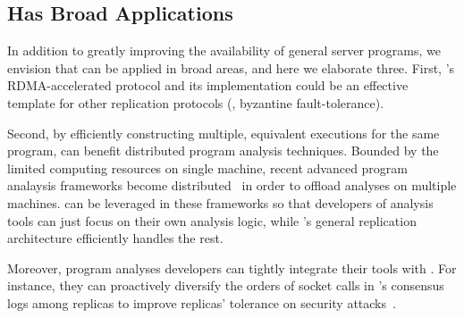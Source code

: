 





\subsection{\xxx Has Broad Applications}\label{sec:apps}

In addition to greatly improving the availability of general server programs, 
we envision that \xxx can be applied in broad areas, and here we elaborate 
three. First, \xxx's RDMA-accelerated \paxos protocol and its implementation 
could be an effective template for other replication protocols (\eg, byzantine 
fault-tolerance). 



Second, by efficiently constructing multiple, equivalent executions for the 
same program, \xxx can benefit distributed program analysis techniques. Bounded 
by the limited computing resources on single machine, recent advanced 
program analaysis frameworks become 
distributed~\cite{speck:asplos08,repframe:apsys15} in order to offload analyses 
on multiple machines. \xxx can be leveraged in these 
frameworks so that developers of analysis tools can just focus on their own 
analysis logic, while \xxx's general replication architecture efficiently 
handles the rest.

Moreover, program analyses developers can tightly integrate their tools with 
\xxx. For instance, they can proactively diversify the orders of socket calls 
in \xxx's consensus logs among replicas to improve replicas' tolerance on 
security attacks~\cite{con:hotpar12}.

